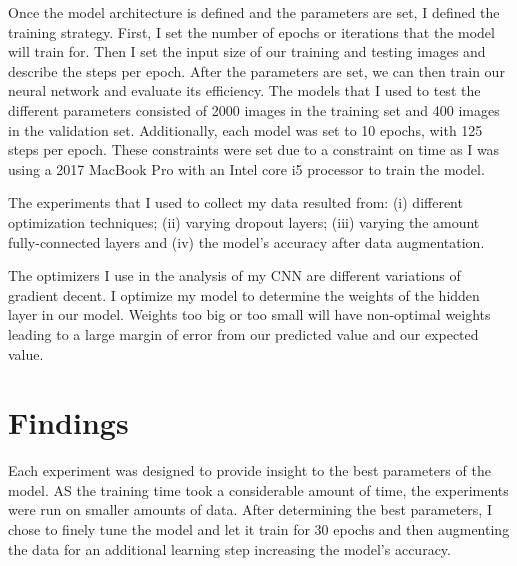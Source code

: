 \documentclass[12pt,english]{article}
\begin{document}
Once the model architecture is defined and the parameters are set, I defined the training strategy. First, I set the number of epochs or iterations that the model will train for. Then I set the input size of our training and testing images and describe the steps per epoch. After the parameters are set, we can then train our neural network and evaluate its efficiency. 
The models that I used to test the different parameters consisted of 2000 images in the training set and 400 images in the validation set. Additionally, each model was set to 10 epochs, with 125 steps per epoch. These constraints were set due to a constraint on time as I was using a 2017 MacBook Pro with an Intel core i5 processor to train the model. \par

The experiments that I used to collect my data resulted from: (i) different optimization techniques; (ii) varying dropout layers; (iii) varying the amount fully-connected layers and (iv) the model’s accuracy after data augmentation.\par

The optimizers I use in the analysis of my CNN are different variations of gradient decent. I optimize my model to determine the weights of the hidden layer in our model. Weights too big or too small will have non-optimal weights leading to a large margin of error from our predicted value and our expected value. 

\section{Findings}
Each experiment was designed to provide insight to the best parameters of the model. AS the training time took a considerable amount of time, the experiments were run on smaller amounts of data. After determining the best parameters, I chose to finely tune the model and let it train for 30 epochs and then augmenting the data for an additional learning step increasing the model’s accuracy. \par
\end{document}
